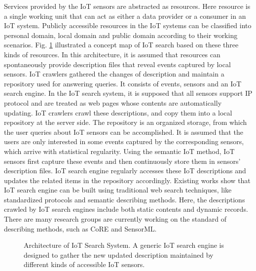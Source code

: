 \documentclass[conference]{IEEEtran}
\begin{document}
Services provided by the IoT sensors are abstracted as resources. 
Here resource is a single working unit that can act as either a data provider or a consumer in an IoT system.
Publicly accessible resources in the IoT systems can be classified into personal domain, local domain and public domain according to their working scenarios. 
Fig. \ref{fig:architecture} illustrated a concept map of IoT search based on these three kinds of resources.
In this architecture, it is assumed that resources can spontaneously provide description files that reveal events captured by local sensors.
IoT crawlers gathered the changes of description and maintain a repository used for answering queries.
It consists of events, sensors and an IoT search engine. 
In the IoT search system, it is supposed that all sensors support IP protocol and are treated as web pages whose contents are automatically updating.
IoT crawlers crawl these descriptions, and copy them into a local repository at the server side.
The repository is an organized storage, from which the user queries about IoT sensors can be accomplished.
It is assumed that the users are only interested in some events captured by the corresponding sensors, which arrive with statistical regularity. Using the semantic IoT method, IoT sensors first capture these events and then continuously store them in sensors’ description files.
IoT search engine regularly accesses these IoT descriptions and updates the related items in the repository accordingly.
Existing works show that IoT search engine can be built using traditional web search techniques, like standardized protocols and semantic describing methods\cite{Pfisterer2011}. 
Here, the descriptions crawled by IoT search engines include both static contents and dynamic records.
There are many research groups are currently working on the standard of describing methods, such as CoRE\cite{CoREWorkingGroup2012} and SensorML\cite{botts2007opengis}. 

\begin{figure}
	\vspace{0.5em}
	\centering
	\hspace{-3.0em}
	
	\captionsetup{justification=justified, singlelinecheck=false}
	\caption{Architecture of IoT Search System. A generic IoT search engine is designed to gather the new updated description maintained by different kinds of accessible IoT sensors.}
	\vspace{-0.5em}
	\label{fig:architecture}
\end{figure}
\end{document}

